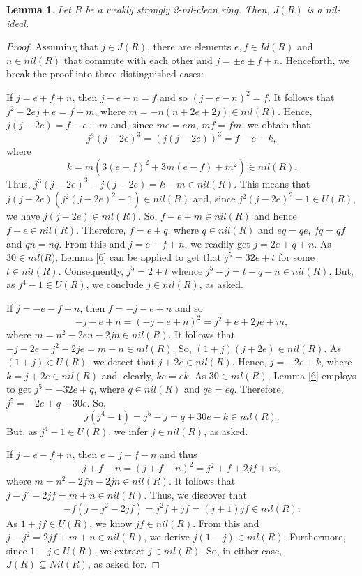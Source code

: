 \documentclass[12pt]{amsart}
\newtheorem{lemma}[theorem]{Lemma}
\theoremstyle{definition}
\begin{document}
\begin{lemma}\label{j}
Let $R$ be a weakly strongly 2-nil-clean ring. Then, $J(R)$ is a nil-ideal.
\end{lemma}	

\begin{proof} Assuming that $j\in J(R)$, there are elements $e,f\in Id(R)$ and $n\in nil(R)$ that commute with each other and $j=\pm e\pm f+n$. Henceforth, we break the proof into three distinguished cases:

\medskip

 If $j=e+f+n$, then $j-e-n=f$ and so $(j-e-n)^2=f$. It follows that $j^2-2ej+e=f+m$, where $m=-n(n+2e+2j)\in nil(R)$. Hence, $j(j-2e)=f-e+m$ and, since $me=em$, $mf=fm$, we obtain that $$j^3(j-2e)^3=(j(j-2e))^3=f-e+k,$$ where $$k=m(3(e-f)^2+3m(e-f)+m^2)\in nil(R).$$ Thus, $j^3(j-2e)^3-j(j-2e)=k-m\in nil(R)$. This means that $j(j-2e)(j^2(j-2e)^2-1)\in nil(R)$ and, since $j^2(j-2e)^2-1\in U(R)$, we have $j(j-2e)\in nil(R)$. So, $f-e+m\in nil(R)$ and hence $f-e\in nil(R)$. Therefore, $f=e+q$, where $q\in nil(R)$ and $eq=qe$, $fq=qf$ and $qn=nq$. From this and $j=e+f+n$, we readily get $j=2e+q+n$. As $30\in nil(R$), Lemma \ref{6} can be applied to get that $j^5=32e+t$ for some $t\in nil(R)$. Consequently, $j^5=2+t$ whence $j^5-j=t-q-n\in nil(R)$. But, as $j^4-1\in U(R)$, we conclude $j\in nil(R)$, as asked.

\medskip

 If $j=-e-f+n$, then $f=-j-e+n$ and so $$-j-e+n=(-j-e+n)^2=j^2+e+2je+m,$$ where $m=n^2-2en-2jn\in nil(R)$. It follows that $-j-2e-j^2-2je=m-n\in nil(R)$. So, $(1+j)(j+2e)\in nil(R)$. As $(1+j)\in U(R)$, we detect that $j+2e\in nil(R)$. Hence, $j=-2e+k$, where $k=j+2e\in nil(R)$ and, clearly, $ke=ek$. As $30\in nil(R)$, Lemma \ref{6} employs to get $j^5=-32e+q$, where $q\in nil(R)$ and $qe=eq$. Therefore, $j^5=-2e+q-30e$. So,  $$j(j^4-1)=j^5-j=q+30e-k\in nil(R).$$ But, as $j^4-1\in U(R)$, we infer $j\in nil(R)$, as asked.

\medskip

 If $j=e-f+n$, then $e=j+f-n$ and thus $$j+f-n=(j+f-n)^2=j^2+f+2jf+m,$$ where $m=n^2-2fn-2jn\in nil(R)$. It follows that $j-j^2-2jf=m+n\in nil(R)$. Thus, we discover that $$-f(j-j^2-2jf)=j^2f+jf=(j+1)jf\in nil(R).$$ As $1+jf\in U(R)$, we know $jf\in nil(R)$. From this and $j-j^2=2jf+m+n\in nil(R)$, we derive $j(1-j) \in nil(R)$. Furthermore, since $1-j\in U(R)$, we extract $j\in nil(R)$. So, in either case, $J(R)\subseteq Nil(R)$, as asked for.
\end{proof}
\end{document}
